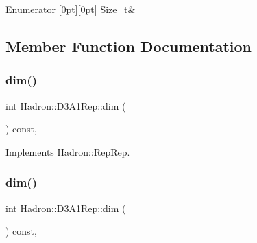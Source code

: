 \begin{DoxyEnumFields}{Enumerator}
[0pt][0pt]{}\mbox{\label{structHadron_1_1D3A1Rep_a6ccea46a453569c55a6fe68fe6adc35faebf01365c47c9e66ebd0e9bebb340fca}} 
Size\+\_\+t&\\
\hline

\end{DoxyEnumFields}


\subsection{Member Function Documentation}
\mbox{\label{structHadron_1_1D3A1Rep_abb120c31183935cf98330a4085ff6b1c}} 
\subsubsection{\texorpdfstring{dim()}{dim()}\hspace{0.1cm}{\footnotesize\ttfamily [1/3]}}
{\footnotesize\ttfamily int Hadron\+::\+D3\+A1\+Rep\+::dim (\begin{DoxyParamCaption}{ }\end{DoxyParamCaption}) const\hspace{0.3cm}{\ttfamily [inline]}, {\ttfamily [virtual]}}



Implements \mbox{\hyperlink{structHadron_1_1RepRep_a92c8802e5ed7afd7da43ccfd5b7cd92b}{Hadron\+::\+Rep\+Rep}}.

\mbox{\label{structHadron_1_1D3A1Rep_abb120c31183935cf98330a4085ff6b1c}} 
\subsubsection{\texorpdfstring{dim()}{dim()}\hspace{0.1cm}{\footnotesize\ttfamily [2/3]}}
{\footnotesize\ttfamily int Hadron\+::\+D3\+A1\+Rep\+::dim (\begin{DoxyParamCaption}{ }\end{DoxyParamCaption}) const\hspace{0.3cm}{\ttfamily [inline]}, {\ttfamily [virtual]}}



